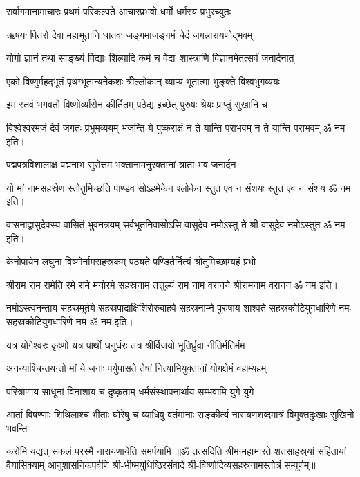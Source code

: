 \twolineshloka
{सर्वागमानामाचारः प्रथमं परिकल्पते}
{आचारप्रभवो धर्मो धर्मस्य प्रभुरच्युतः}

\twolineshloka
{ऋषयः पितरो देवा महाभूतानि धातवः}
{जङ्गमाजङ्गमं चेदं जगन्नारायणोद्भवम्}

\twolineshloka
{योगो ज्ञानं तथा साङ्ख्यं विद्याः शिल्पादि कर्म च}
{वेदाः शास्त्राणि विज्ञानमेतत्सर्वं जनार्दनात्}

\twolineshloka
{एको विष्णुर्महद्भूतं पृथग्भूतान्यनेकशः}
{त्रीँल्लोकान् व्याप्य भूतात्मा भुङ्क्ते विश्वभुगव्ययः}

\twolineshloka
{इमं स्तवं भगवतो विष्णोर्व्यासेन कीर्तितम्}
{पठेद्य इच्छेत् पुरुषः श्रेयः प्राप्तुं सुखानि च}

\twolineshloka
{विश्वेश्वरमजं देवं जगतः प्रभुमव्ययम्}
{भजन्ति ये पुष्कराक्षं न ते यान्ति पराभवम्}
न ते यान्ति पराभवम् ॐ नम इति।

\twolineshloka
{पद्मपत्रविशालाक्ष पद्मनाभ सुरोत्तम}
{भक्तानामनुरक्तानां त्राता भव जनार्दन}

\twolineshloka
{यो मां नामसहस्रेण स्तोतुमिच्छति पाण्डव}
{सोऽहमेकेन श्लोकेन स्तुत एव न संशयः}
स्तुत एव न संशय ॐ नम इति।

\twolineshloka
{वासनाद्वासुदेवस्य वासितं भुवनत्रयम्}
{सर्वभूतनिवासोऽसि वासुदेव नमोऽस्तु ते}
श्री-वासुदेव नमोऽस्तुत ॐ नम इति।

\twolineshloka
{केनोपायेन लघुना विष्णोर्नामसहस्रकम्}
{पठ्यते पण्डितैर्नित्यं श्रोतुमिच्छाम्यहं प्रभो}

\twolineshloka
{श्रीराम राम रामेति रमे रामे मनोरमे}
{सहस्रनाम तत्तुल्यं राम नाम वरानने}%
श्रीरामनाम वरानन ॐ नम इति।

\twolineshloka
{नमोऽस्त्वनन्ताय सहस्रमूर्तये सहस्रपादाक्षिशिरोरुबाहवे}
{सहस्रनाम्ने पुरुषाय शाश्वते सहस्रकोटियुगधारिणे नमः}
सहस्रकोटियुगधारिणे नम ॐ नम इति।

\twolineshloka
{यत्र योगेश्वरः कृष्णो यत्र पार्थो धनुर्धरः}
{तत्र श्रीर्विजयो भूतिर्ध्रुवा नीतिर्मतिर्मम}

\twolineshloka
{अनन्याश्चिन्तयन्तो मां ये जनाः पर्युपासते}
{तेषां नित्याभियुक्तानां योगक्षेमं वहाम्यहम्}

\twolineshloka
{परित्राणाय साधूनां विनाशाय च दुष्कृताम्}
{धर्मसंस्थापनार्थाय सम्भवामि युगे युगे}

\fourlineindentedshloka
{आर्ता विषण्णाः शिथिलाश्च भीताः}
{घोरेषु च व्याधिषु वर्तमानाः}
{सङ्कीर्त्य नारायणशब्दमात्रं}
{विमुक्तदुःखाः सुखिनो भवन्ति}

{करोमि यद्यत् सकलं परस्मै नारायणायेति समर्पयामि}
॥ॐ तत्सदिति श्रीमन्महाभारते शतसाहस्र्यां संहितायां वैयासिक्याम् आनुशासनिकपर्वणि श्री-भीष्मयुधिष्ठिरसंवादे श्री-विष्णोर्दिव्यसहस्रनामस्तोत्रं सम्पूर्णम्॥
\setlength{\shlokaspaceskip}{24pt}
